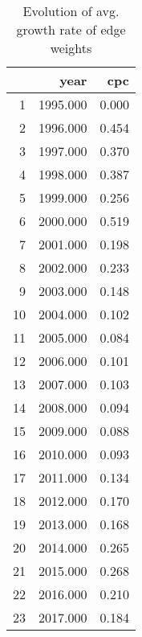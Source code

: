\begin{table}[ht]
\centering
\begin{tabular}{rrr}
  \hline
 & year & cpc \\ 
  \hline
1 & 1995.000 & 0.000 \\ 
  2 & 1996.000 & 0.454 \\ 
  3 & 1997.000 & 0.370 \\ 
  4 & 1998.000 & 0.387 \\ 
  5 & 1999.000 & 0.256 \\ 
  6 & 2000.000 & 0.519 \\ 
  7 & 2001.000 & 0.198 \\ 
  8 & 2002.000 & 0.233 \\ 
  9 & 2003.000 & 0.148 \\ 
  10 & 2004.000 & 0.102 \\ 
  11 & 2005.000 & 0.084 \\ 
  12 & 2006.000 & 0.101 \\ 
  13 & 2007.000 & 0.103 \\ 
  14 & 2008.000 & 0.094 \\ 
  15 & 2009.000 & 0.088 \\ 
  16 & 2010.000 & 0.093 \\ 
  17 & 2011.000 & 0.134 \\ 
  18 & 2012.000 & 0.170 \\ 
  19 & 2013.000 & 0.168 \\ 
  20 & 2014.000 & 0.265 \\ 
  21 & 2015.000 & 0.268 \\ 
  22 & 2016.000 & 0.210 \\ 
  23 & 2017.000 & 0.184 \\ 
   \hline
\end{tabular}
\caption{Evolution of avg. growth rate of edge weights} 
\end{table}

